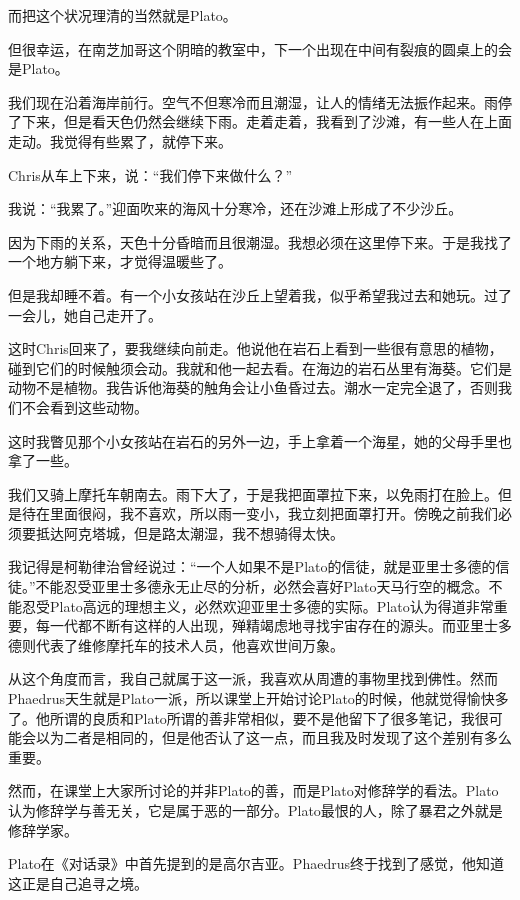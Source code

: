 \documentclass[UTF8]{article}
\begin{document}
\par 而把这个状况理清的当然就是Plato。
\par 但很幸运，在南芝加哥这个阴暗的教室中，下一个出现在中间有裂痕的圆桌上的会是Plato。
\par 我们现在沿着海岸前行。空气不但寒冷而且潮湿，让人的情绪无法振作起来。雨停了下来，但是看天色仍然会继续下雨。走着走着，我看到了沙滩，有一些人在上面走动。我觉得有些累了，就停下来。
\par Chris从车上下来，说：“我们停下来做什么？”
\par 我说：“我累了。”迎面吹来的海风十分寒冷，还在沙滩上形成了不少沙丘。
\par 因为下雨的关系，天色十分昏暗而且很潮湿。我想必须在这里停下来。于是我找了一个地方躺下来，才觉得温暖些了。
\par 但是我却睡不着。有一个小女孩站在沙丘上望着我，似乎希望我过去和她玩。过了一会儿，她自己走开了。
\par 这时Chris回来了，要我继续向前走。他说他在岩石上看到一些很有意思的植物，碰到它们的时候触须会动。我就和他一起去看。在海边的岩石丛里有海葵。它们是动物不是植物。我告诉他海葵的触角会让小鱼昏过去。潮水一定完全退了，否则我们不会看到这些动物。
\par 这时我瞥见那个小女孩站在岩石的另外一边，手上拿着一个海星，她的父母手里也拿了一些。
\par 我们又骑上摩托车朝南去。雨下大了，于是我把面罩拉下来，以免雨打在脸上。但是待在里面很闷，我不喜欢，所以雨一变小，我立刻把面罩打开。傍晚之前我们必须要抵达阿克塔城，但是路太潮湿，我不想骑得太快。
\par 我记得是柯勒律治曾经说过：“一个人如果不是Plato的信徒，就是亚里士多德的信徒。”不能忍受亚里士多德永无止尽的分析，必然会喜好Plato天马行空的概念。不能忍受Plato高远的理想主义，必然欢迎亚里士多德的实际。Plato认为得道非常重要，每一代都不断有这样的人出现，殚精竭虑地寻找宇宙存在的源头。而亚里士多德则代表了维修摩托车的技术人员，他喜欢世间万象。
\par 从这个角度而言，我自己就属于这一派，我喜欢从周遭的事物里找到佛性。然而Phaedrus天生就是Plato一派，所以课堂上开始讨论Plato的时候，他就觉得愉快多了。他所谓的良质和Plato所谓的善非常相似，要不是他留下了很多笔记，我很可能会以为二者是相同的，但是他否认了这一点，而且我及时发现了这个差别有多么重要。
\par 然而，在课堂上大家所讨论的并非Plato的善，而是Plato对修辞学的看法。Plato认为修辞学与善无关，它是属于恶的一部分。Plato最恨的人，除了暴君之外就是修辞学家。
\par Plato在《对话录》中首先提到的是高尔吉亚。Phaedrus终于找到了感觉，他知道这正是自己追寻之境。
\end{document}
